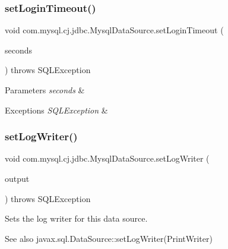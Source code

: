 \subsubsection{\texorpdfstring{set\+Login\+Timeout()}{setLoginTimeout()}}
{\footnotesize\ttfamily void com.\+mysql.\+cj.\+jdbc.\+Mysql\+Data\+Source.\+set\+Login\+Timeout (\begin{DoxyParamCaption}\item[{int}]{seconds }\end{DoxyParamCaption}) throws S\+Q\+L\+Exception}


\begin{DoxyParams}{Parameters}
{\em seconds} & \\
\hline
\end{DoxyParams}

\begin{DoxyExceptions}{Exceptions}
{\em S\+Q\+L\+Exception} & \\
\hline
\end{DoxyExceptions}
\mbox{\label{classcom_1_1mysql_1_1cj_1_1jdbc_1_1_mysql_data_source_a53de4e7ee2a4cffff97cf0432b395fcc}} 
\subsubsection{\texorpdfstring{set\+Log\+Writer()}{setLogWriter()}}
{\footnotesize\ttfamily void com.\+mysql.\+cj.\+jdbc.\+Mysql\+Data\+Source.\+set\+Log\+Writer (\begin{DoxyParamCaption}\item[{Print\+Writer}]{output }\end{DoxyParamCaption}) throws S\+Q\+L\+Exception}

Sets the log writer for this data source.

\begin{DoxySeeAlso}{See also}
javax.\+sql.\+Data\+Source\+::set\+Log\+Writer(\+Print\+Writer) 
\end{DoxySeeAlso}
\mbox{\label{classcom_1_1mysql_1_1cj_1_1jdbc_1_1_mysql_data_source_a540318fe0f1175849a5773300ec4fa26}} 
